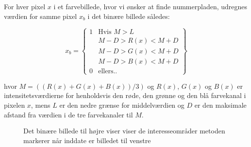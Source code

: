 For hver pixel $x$ i et farvebillede, hvor vi ønsker at finde nummerpladen, udregnes værdien for samme pixel $x_{b}$ i det binære billede således:

\begin{equation}
x_{b} = 
\begin{Bmatrix}
1 & \text{Hvis } M > L\\
 & M-D > R(x) < M+D\\
  & M-D > G(x) < M+D\\
   & M-D > B(x) < M+D\\
0 & \text{ellers..}
\end{Bmatrix}
\end{equation}


hvor $M = ((R(x)+G(x)+B(x))/3)$ og $R(x)$, $G(x)$ og $B(x)$ er intensitetsværdierne for henholdsvis den røde, den grønne og den blå farvekanal i pixelen $x$, mens $L$ er den nedre grænse for middelværdien og $D$ er den maksimale afstand fra værdien i de tre farvekanaler til $M$.




\begin{figure}[htbp]
  \centering
  \begin{minipage}[b]{5 cm}
  \end{minipage}
  \begin{minipage}[b]{5 cm}
  \end{minipage}
  \caption{Det binære billede til højre viser viser de interesseområder metoden markerer når inddate er billedet til venstre}
  \label{fig:DetectSameness-binary}
\end{figure}



